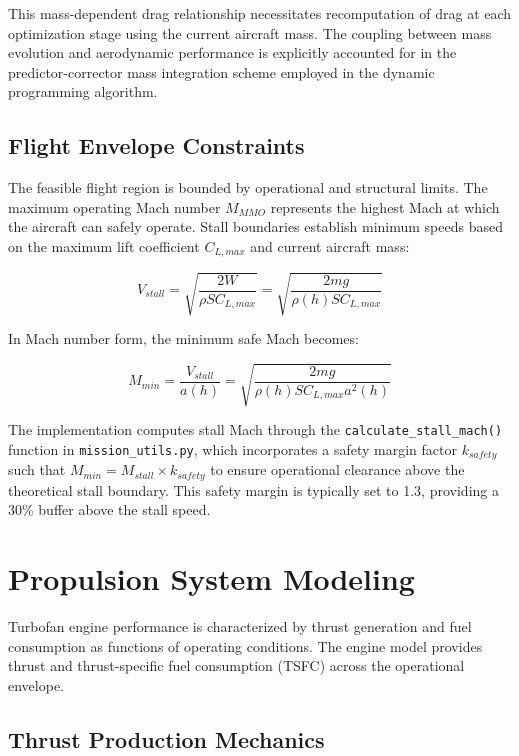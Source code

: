 This mass-dependent drag relationship necessitates recomputation of drag at each optimization stage using the current aircraft mass. The coupling between mass evolution and aerodynamic performance is explicitly accounted for in the predictor-corrector mass integration scheme employed in the dynamic programming algorithm.

\subsection{Flight Envelope Constraints}

The feasible flight region is bounded by operational and structural limits. The maximum operating Mach number $M_{MMO}$ represents the highest Mach at which the aircraft can safely operate. Stall boundaries establish minimum speeds based on the maximum lift coefficient $C_{L,max}$ and current aircraft mass:

\begin{equation}
V_{stall} = \sqrt{\frac{2W}{\rho S C_{L,max}}} = \sqrt{\frac{2mg}{\rho(h) S C_{L,max}}}
\end{equation}

In Mach number form, the minimum safe Mach becomes:

\begin{equation}
M_{min} = \frac{V_{stall}}{a(h)} = \sqrt{\frac{2mg}{\rho(h) S C_{L,max} a^2(h)}}
\end{equation}

The implementation computes stall Mach through the \texttt{calculate\_stall\_mach()} function in \texttt{mission\_utils.py}, which incorporates a safety margin factor $k_{safety}$ such that $M_{min} = M_{stall} \times k_{safety}$ to ensure operational clearance above the theoretical stall boundary. This safety margin is typically set to 1.3, providing a 30\% buffer above the stall speed.

\section{Propulsion System Modeling}

Turbofan engine performance is characterized by thrust generation and fuel consumption as functions of operating conditions. The engine model provides thrust and thrust-specific fuel consumption (TSFC) across the operational envelope.

\subsection{Thrust Production Mechanics}

